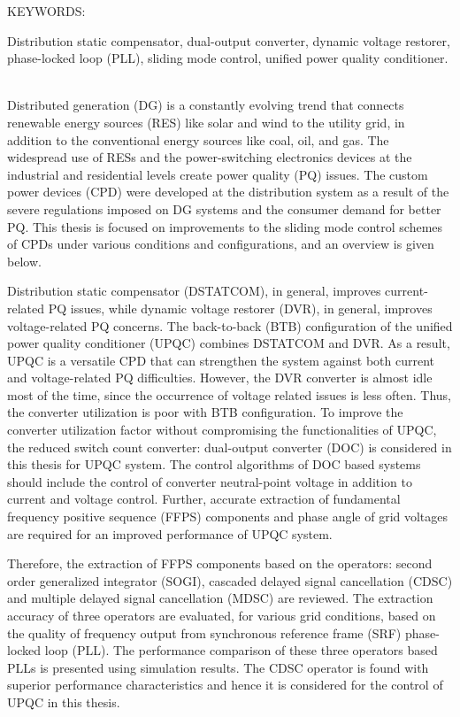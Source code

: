 \abstract
%
\noindent KEYWORDS: \hspace*{0.5em} \parbox[t]{4in}{Distribution static compensator, dual-output converter, dynamic voltage restorer, phase-locked loop (PLL), sliding mode control, unified power quality conditioner.}
%
\vspace*{30pt}
\\
%
Distributed generation (DG) is a constantly evolving trend that connects renewable energy sources (RES) like solar and wind to the utility grid, in addition to the conventional energy sources like coal, oil, and gas. The widespread use of RESs and the power-switching electronics devices at the industrial and residential levels create power quality (PQ) issues. The custom power devices (CPD) were developed at the distribution system as a result of the severe regulations imposed on DG systems and the consumer demand for better PQ. This thesis is focused on improvements to the sliding mode control schemes of CPDs under various conditions and configurations, and an overview is given below.

Distribution static compensator (DSTATCOM), in general, improves current-related PQ issues, while dynamic voltage restorer (DVR), in general, improves voltage-related PQ concerns. The back-to-back (BTB) configuration of the unified power quality conditioner (UPQC) combines DSTATCOM and DVR. As a result, UPQC is a versatile CPD that can strengthen the system against both current and voltage-related PQ difficulties. However, the DVR converter is almost idle most of the time, since the occurrence of voltage related issues is less often. Thus, the converter utilization is poor with BTB configuration. To improve the converter utilization factor without compromising the functionalities of UPQC, the reduced switch count converter: dual-output converter (DOC) is considered in this thesis for UPQC system. The control algorithms of DOC based systems should include the control of converter neutral-point voltage in addition to current and voltage control. Further, accurate extraction of fundamental frequency positive sequence (FFPS) components and phase angle of grid voltages are required for an improved performance of UPQC system.     

Therefore, the extraction of FFPS components based on the operators: second order generalized integrator (SOGI), cascaded delayed signal cancellation (CDSC) and multiple delayed signal cancellation (MDSC) are reviewed. The extraction accuracy of three operators are evaluated, for various grid conditions, based on the quality of frequency output from synchronous reference frame (SRF) phase-locked loop (PLL). The performance comparison of these three operators based PLLs is presented using simulation results. The CDSC operator is found with superior performance characteristics and hence it is considered for the control of UPQC in this thesis.  

